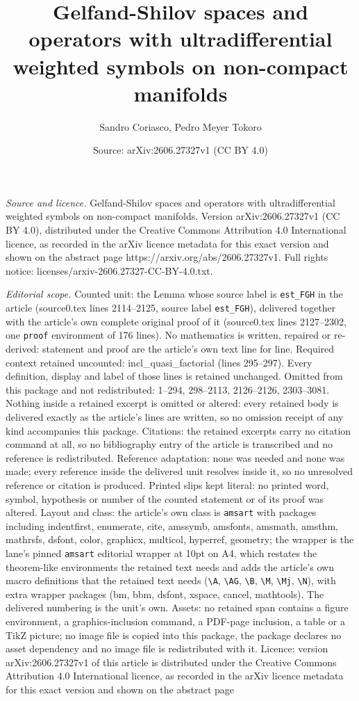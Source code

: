 \documentclass[10pt,a4paper]{amsart}
\title[Gelfand-Shilov spaces and operators with ultradifferential w]{Gelfand-Shilov spaces and operators with ultradifferential weighted symbols on non-compact manifolds}
\author{Sandro Coriasco, Pedro Meyer Tokoro}
\date{Source: arXiv:2606.27327v1 (CC BY 4.0)}
\begin{document}
\maketitle

\noindent\emph{Source and licence.} Gelfand-Shilov spaces and operators with ultradifferential weighted symbols on non-compact manifolds. Version arXiv:2606.27327v1 (CC BY 4.0), distributed under the Creative Commons Attribution 4.0 International licence, as recorded in the arXiv licence metadata for this exact version and shown on the abstract page https://arxiv.org/abs/2606.27327v1. Full rights notice: licenses/arxiv-2606.27327-CC-BY-4.0.txt.\par\smallskip

\noindent\textit{Editorial scope.} Counted unit: the Lemma whose source label is \texttt{est\_FGH} in the article (source0.tex lines 2114--2125, source label \texttt{est\_FGH}), delivered together with the article's own complete original proof of it (source0.tex lines 2127--2302, one \texttt{proof} environment of 176 lines). No mathematics is written, repaired or re-derived: statement and proof are the article's own text line for line. Required context retained uncounted: incl\_quasi\_factorial (lines 295--297). Every definition, display and label of those lines is retained unchanged. Omitted from this package and not redistributed: 1--294, 298--2113, 2126--2126, 2303--3081. Nothing inside a retained excerpt is omitted or altered: every retained body is delivered exactly as the article's lines are written, so no omission receipt of any kind accompanies this package. Citations: the retained excerpts carry no citation command at all, so no bibliography entry of the article is transcribed and no reference is redistributed. Reference adaptation: none was needed and none was made; every reference inside the delivered unit resolves inside it, so no unresolved reference or citation is produced. Printed slips kept literal: no printed word, symbol, hypothesis or number of the counted statement or of its proof was altered. Layout and class: the article's own class is \texttt{amsart} with packages including indentfirst, enumerate, cite, amssymb, amsfonts, amsmath, amsthm, mathrsfs, dsfont, color, graphicx, multicol, hyperref, geometry; the wrapper is the lane's pinned \texttt{amsart} editorial wrapper at 10pt on A4, which restates the theorem-like environments the retained text needs and adds the article's own macro definitions that the retained text needs (\texttt{\textbackslash A}, \texttt{\textbackslash AG}, \texttt{\textbackslash B}, \texttt{\textbackslash M}, \texttt{\textbackslash Mj}, \texttt{\textbackslash N}), with extra wrapper packages (bm, bbm, dsfont, xspace, cancel, mathtools). The delivered numbering is the unit's own. Assets: no retained span contains a figure environment, a graphics-inclusion command, a PDF-page inclusion, a table or a TikZ picture; no image file is copied into this package, the package declares no asset dependency and no image file is redistributed with it. Licence: version arXiv:2606.27327v1 of this article is distributed under the Creative Commons Attribution 4.0 International licence, as recorded in the arXiv licence metadata for this exact version and shown on the abstract page 
\end{document}
